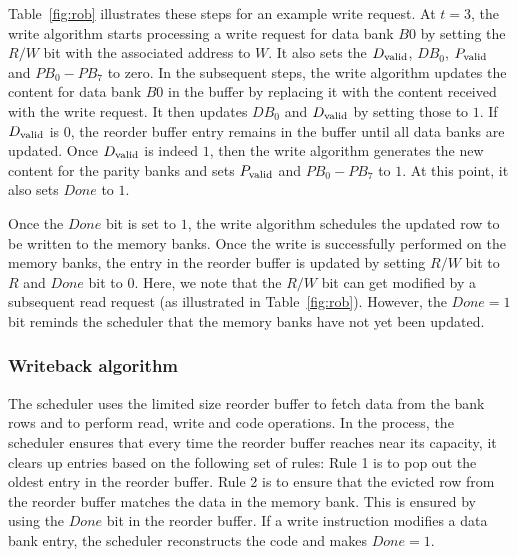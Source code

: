 Table~\ref{fig:rob} illustrates these steps for an example write request. At $t = 3$, the write algorithm starts processing a write request for data bank $B0$ by setting the $R/W$ bit with the associated address to $W$. It also sets the $D_{\rm valid}$, $DB_{0}$, $P_{\rm valid}$ and $PB_{0}-PB_{7}$ to zero. In the subsequent steps, the write algorithm updates the content for data bank $B0$ in the buffer by replacing it with the content received with the write request. It then updates $DB_0$ and $D_{\rm valid}$ by setting those to $1$. If $D_{\rm valid}$ is $0$, the reorder buffer entry remains in the buffer until all data banks are updated. Once $D_{\rm valid}$ is indeed $1$, then the write algorithm generates the new content for the parity banks and sets $P_{\rm valid}$ and $PB_0 -PB_7$ to $1$. At this point, it also sets $Done$ to $1$.

Once the $Done$ bit is set to $1$, the write algorithm schedules the updated row to be written to the memory banks. Once the write is successfully performed on the memory banks, the entry in the reorder buffer is updated by setting $R/W$ bit to $R$ and $Done$ bit to $0$. Here, we note that the $R/W$ bit can get modified by a subsequent read request (as illustrated in Table~\ref{fig:rob}). However, the $Done = 1$ bit reminds the scheduler that the memory banks have not yet been updated.



\subsubsection{Writeback algorithm}
\label{sec:writeback}
The scheduler uses the limited size reorder buffer to fetch data from the bank rows and to perform read, write and code operations. In the process, the scheduler ensures that every time the reorder buffer reaches near its capacity, it clears up entries based on the following set of rules: Rule 1 is to pop out the oldest entry in the reorder buffer. Rule 2 is to ensure that the evicted row from the reorder buffer matches the data in the memory bank. This is ensured by using the $Done$ bit in the reorder buffer. If a write instruction modifies a data bank entry, the scheduler reconstructs the code and makes $Done = 1$. 